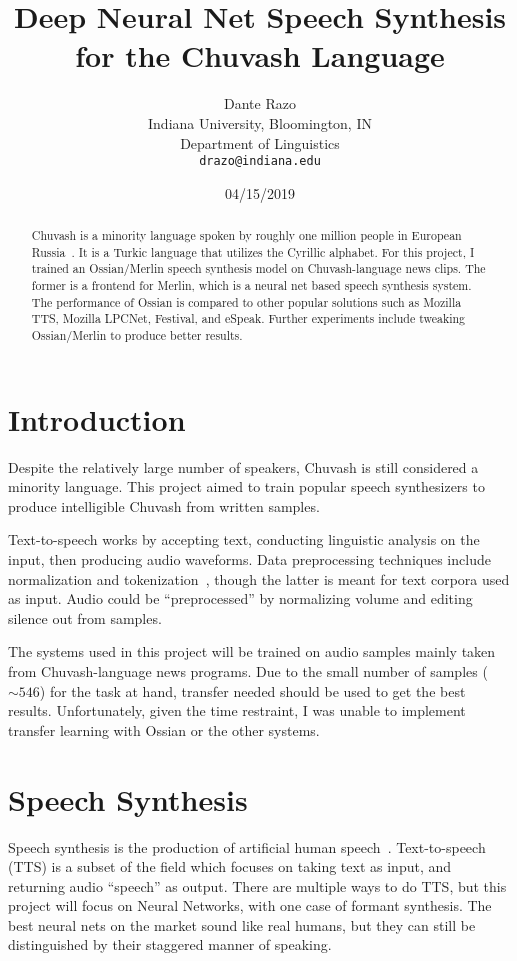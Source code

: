\documentclass[11pt,a4paper]{article}
\title{Deep Neural Net Speech Synthesis for the Chuvash Language}
\author{Dante Razo \\
  Indiana University, Bloomington, IN \\
  Department of Linguistics \\
  {\tt drazo@indiana.edu} \\}
\date{04/15/2019}
\begin{document}
\maketitle
\begin{abstract}
  Chuvash is a minority language spoken by roughly one million people in European Russia~\cite{RBS:12}. It is a Turkic language that utilizes the Cyrillic alphabet. For this project, I trained an Ossian/Merlin speech synthesis model on Chuvash-language news clips. The former is a frontend for Merlin, which is a neural net based speech synthesis system. The performance of Ossian is compared to other popular solutions such as Mozilla TTS, Mozilla LPCNet, Festival, and eSpeak. Further experiments include tweaking Ossian/Merlin to produce better results.
\end{abstract}

\section{Introduction}\label{sect:intro}
Despite the relatively large number of speakers, Chuvash is still considered a minority language. This project aimed to train popular speech synthesizers to produce intelligible Chuvash from written samples.

Text-to-speech works by accepting text, conducting linguistic analysis on the input, then producing audio waveforms. Data preprocessing techniques include normalization and tokenization~\cite{wiki-lexanalysis}, though the latter is meant for text corpora used as input. Audio could be ``preprocessed'' by normalizing volume and editing silence out from samples.

The systems used in this project will be trained on audio samples mainly taken from Chuvash-language news programs. Due to the small number of samples ($\sim546$) for the task at hand, transfer needed should be used to get the best results. Unfortunately, given the time restraint, I was unable to implement transfer learning with Ossian or the other systems.

\section{Speech Synthesis}\label{sect:speech}
Speech synthesis is the production of artificial human speech~\cite{wiki-speechsynthesis}. Text-to-speech (TTS) is a subset of the field which focuses on taking text as input, and returning audio ``speech'' as output. There are multiple ways to do TTS, but this project will focus on Neural Networks, with one case of formant synthesis. The best neural nets on the market sound like real humans, but they can still be distinguished by their staggered manner of speaking.
\end{document}
